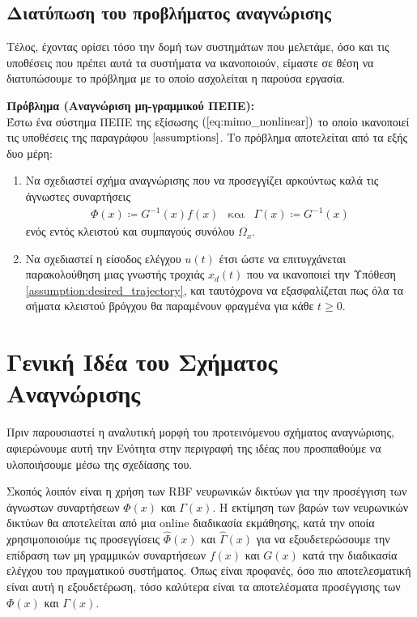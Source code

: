 \subsection{Διατύπωση του προβλήματος αναγνώρισης} \label{subsec:problem_definition}
Τέλος, έχοντας ορίσει τόσο την δομή των συστημάτων που μελετάμε, όσο και τις υποθέσεις που πρέπει αυτά τα συστήματα να ικανοποιούν, είμαστε σε θέση να διατυπώσουμε το πρόβλημα με το οποίο ασχολείται η παρούσα εργασία.

\textbf{Πρόβλημα (Αναγνώριση μη-γραμμικού ΠΕΠΕ):}\\
Έστω ένα σύστημα ΠΕΠΕ της εξίσωσης $(\ref{eq:mimo_nonlinear})$ το οποίο ικανοποιεί τις υποθέσεις της παραγράφου $\ref{assumptions}$. Το πρόβλημα αποτελείται από τα εξής δυο μέρη:
\begin{enumerate}
	\item Να σχεδιαστεί σχήμα αναγνώρισης που να προσεγγίζει αρκούντως καλά τις άγνωστες συναρτήσεις 
	\begin{equation*}
		\begin{matrix}
		\Phi(x) \coloneqq G^{-1}(x)f(x) & \text{και} & 
		\Gamma(x) \coloneqq G^{-1}(x)
		\end{matrix}
	\end{equation*}
	ενός εντός κλειστού και συμπαγούς συνόλου $\Omega_x$.

	\item Να σχεδιαστεί η είσοδος ελέγχου $u(t)$ έτσι ώστε να επιτυγχάνεται παρακολούθηση μιας γνωστής τροχιάς $x_d(t)$ που να ικανοποιεί την Υπόθεση \ref{assumption:desired_trajectory}, και ταυτόχρονα να εξασφαλίζεται πως όλα τα σήματα κλειστού βρόγχου θα παραμένουν φραγμένα για κάθε $t \geq 0$.
\end{enumerate}

\section{Γενική Ιδέα του Σχήματος Αναγνώρισης}
Πριν παρουσιαστεί η αναλυτική μορφή του προτεινόμενου σχήματος αναγνώρισης, αφιερώνουμε αυτή την Ενότητα στην περιγραφή της ιδέας που προσπαθούμε να υλοποιήσουμε μέσω της σχεδίασης του.

Σκοπός λοιπόν είναι η χρήση των RBF νευρωνικών δικτύων για την προσέγγιση των άγνωστων συναρτήσεων $\Phi(x)$ και $\Gamma(x)$. Η εκτίμηση των βαρών των νευρωνικών δικτύων θα αποτελείται από μια online διαδικασία εκμάθησης, κατά την οποία χρησιμοποιούμε τις προσεγγίσεις $\hat{\Phi}(x)$ και $\hat{\Gamma}(x)$ για να εξουδετερώσουμε την επίδραση των μη γραμμικών συναρτήσεων $f(x)$ και $G(x)$ κατά την διαδικασία ελέγχου του πραγματικού συστήματος. Όπως είναι προφανές, όσο πιο αποτελεσματική είναι αυτή η εξουδετέρωση, τόσο καλύτερα είναι τα αποτελέσματα προσέγγισης των $\Phi(x)$ και $\Gamma(x)$.

